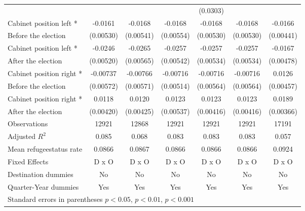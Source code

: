 \begin{table}[!ht]
\begin{tabular}{l*{6}{c}}
                    &                     &                     &                     &    (0.0303)         &                     &                     \\
[0,5em]
Cabinet position left * &     -0.0161\sym{**} &     -0.0168\sym{**} &     -0.0168\sym{**} &     -0.0168\sym{**} &     -0.0168\sym{**} &     -0.0166\sym{***}\\
Before the election                    &   (0.00530)         &   (0.00541)         &   (0.00554)         &   (0.00530)         &   (0.00530)         &   (0.00441)         \\
[0,5em]
Cabinet position left * &     -0.0246\sym{***}&     -0.0265\sym{***}&     -0.0257\sym{***}&     -0.0257\sym{***}&     -0.0257\sym{***}&     -0.0167\sym{**} \\
After the election                    &   (0.00520)         &   (0.00565)         &   (0.00542)         &   (0.00534)         &   (0.00534)         &   (0.00478)         \\
[0,5em]
Cabinet position right * &    -0.00737         &    -0.00766         &    -0.00716         &    -0.00716         &    -0.00716         &      0.0126\sym{**} \\
Before the election                    &   (0.00572)         &   (0.00571)         &   (0.00514)         &   (0.00564)         &   (0.00564)         &   (0.00457)         \\
[0,5em]
Cabinet position right * &      0.0118\sym{**} &      0.0120\sym{**} &      0.0123\sym{*}  &      0.0123\sym{**} &      0.0123\sym{**} &      0.0189\sym{***}\\
After the election                    &   (0.00420)         &   (0.00425)         &   (0.00537)         &   (0.00416)         &   (0.00416)         &   (0.00366)         \\
\hline
Observations        &       12921         &       12868         &       12921         &       12921         &       12921         &       17191         \\
Adjusted \(R^{2}\)  &       0.085         &       0.068         &       0.083         &       0.083         &       0.083         &       0.057         \\
Mean refugeestatus rate&      0.0866         &      0.0867         &      0.0866         &      0.0866         &      0.0866         &      0.0924         \\
Fixed Effects       &       D x O         &       D x O         &       D x O         &       D x O         &       D x O         &       D x O         \\
Destination dummies &          No         &          No         &          No         &          No         &          No         &          No         \\
Quarter-Year dummies&         Yes         &         Yes         &         Yes         &         Yes         &         Yes         &         Yes         \\
\hline\hline
\multicolumn{7}{l}{ Standard errors in parentheses \sym{*} \(p<0.05\), \sym{**} \(p<0.01\), \sym{***} \(p<0.001\)}\\
\end{tabular}
\end{table}
